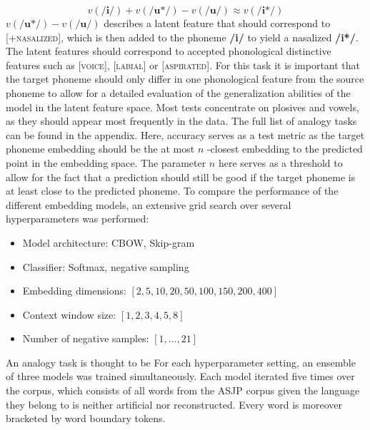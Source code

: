 \documentclass[11pt]{article}
\begin{document}
\begin{equation}
v(\textbf{/i/} ) + v(\textbf{/u*/} ) -  v(\textbf{/u/} ) \approx v(\textbf{/i*/} )
\end{equation}
$v(\textbf{/u*/} ) -  v(\textbf{/u/} )$ describes a latent feature that should correspond to \textsc{[+nasalized]}, which is then added to the phoneme \textbf{/i/} to yield a nasalized \textbf{/i*/}. The latent features should correspond to accepted phonological distinctive features such as \textsc{[voice]}, \textsc{[labial]} or \textsc{[aspirated]}. For this task it is important that the target phoneme should only differ in one phonological feature from the source phoneme to allow for a detailed evaluation of the generalization abilities of the model in the latent feature space. Most tests concentrate on plosives and vowels, as they should appear most frequently in the data. The full list of analogy tasks can be found in the appendix. Here, accuracy serves as a test metric as the target phoneme embedding should be the at most $n$ -closest embedding to the predicted point in the embedding space. The parameter $n$ here serves as a threshold to allow for the fact that a prediction should still be good if the target phoneme is at least close to the predicted phoneme.
To compare the performance of the different embedding models, an extensive grid search over several hyperparameters was performed:
\begin{itemize}
\item Model architecture: CBOW, Skip-gram
\item Classifier: Softmax, negative sampling
\item Embedding dimensions: $[2, 5,10, 20, 50, 100, 150, 200, 400 ]$
\item Context window size: $[1,2,3,4,5,8]$
\item Number of negative samples: $[1, ..., 21]$
\end{itemize}
An analogy task is thought to be  For each hyperparameter setting, an ensemble of three models was trained simultaneously. Each model iterated five times over the corpus, which consists of all words from the ASJP corpus given the language they belong to is neither artificial nor reconstructed. Every word is moreover bracketed by word boundary tokens.
\end{document}
